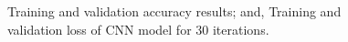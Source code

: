 \begin{figure}%
	\centering
	
	\hspace{8pt}%
	\caption[A set of four subfigures.]{
		 Training and validation accuracy results; and,
		 Training and validation loss of CNN model for 30 iterations.}%
	\label{fig:acc_val}%
\end{figure}
